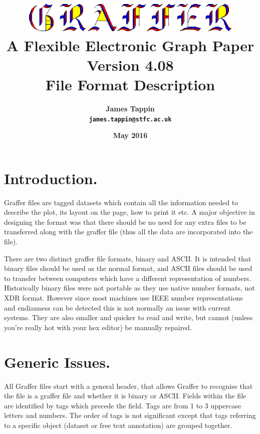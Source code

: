 \documentclass[english]{article}
\begin{document}
\title{\includegraphics[width=0.80\textwidth]{logo} \\
A Flexible Electronic Graph Paper\\
Version 4.08\\
File Format Description}

\author{\textsf{\textbf{\Large James Tappin}}\\
\texttt{\textbf{\Large james.tappin@stfc.ac.uk}}}

\date{\textsf{\textbf{\large May 2016}}}

\maketitle

\tableofcontents{}
\section{Introduction.}

Graffer files are tagged datasets which contain all the information
needed to describe the plot, its layout on the page, how to print
it etc. A major objective in designing the format was that there should
be no need for any extra files to be transferred along with the graffer
file (thus all the data are incorporated into the file).

There are two distinct graffer file formats, binary and ASCII. It is
intended that binary files should be used as the normal format, and
ASCII files should be used to transfer between computers which have a
different representation of numbers. Historically binary files were not
portable as they use native number formats, not XDR format. However
since most machines use IEEE number representations and endianness can
be detected this is not normally an issue with current systems. They
are also smaller and quicker to read and write, but cannot (unless
you're really hot with your hex editor) be manually repaired.


\section{Generic Issues.}

All Graffer files start with a general header, that allows Graffer
to recognise that the file is a graffer file and whether it is binary
or ASCII. Fields within the file are identified by tags which precede
the field. Tags are from 1 to 3 uppercase letters and numbers. The
order of tags is not significant except that tags referring to a specific
object (dataset or free text annotation) are grouped together.
\end{document}
